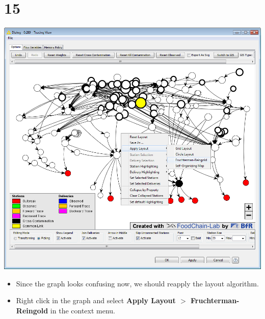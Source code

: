\documentclass{beamer}
\begin{document}
\section{15}
\begin{frame}
	\begin{center}
  		\includegraphics[height=0.6\textheight]{15.png}
	\end{center}
	\begin{itemize}
		\item Since the graph looks confusing now, we should reapply the layout algorithm.
		\item Right click in the graph and select \textbf{Apply Layout $>$ Fruchterman-Reingold} in the context menu.
	\end{itemize}
\end{frame}
\end{document}
